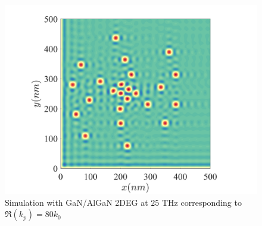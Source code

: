 \documentclass[11pt]{article}
\begin{document}
\begin{figure}[h!]
  \centering
  \includegraphics[scale=1]{plasmonic_sim.png}
  \caption{Simulation with GaN/AlGaN 2DEG at $25$ THz corresponding to $\Re(k_p) = 80 k_0$}
  \label{fig:plasmonic_sim}
\end{figure}



%

\clearpage %
% 


\end{document}
